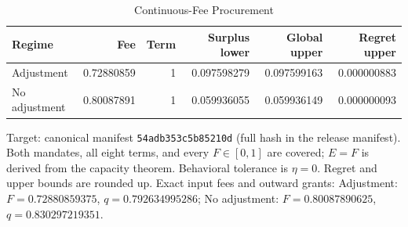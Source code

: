\begin{table}[t]
\caption{Continuous-Fee Procurement}\label{tab:continuous}
\centering
\footnotesize
\begin{tabular}{@{}lrrrrr@{}}
\toprule
Regime & Fee & Term & Surplus lower & Global upper & Regret upper \\
\midrule
Adjustment & 0.72880859 & 1 & 0.097598279 & 0.097599163 & 0.000000883 \\
No adjustment & 0.80087891 & 1 & 0.059936055 & 0.059936149 & 0.000000093 \\
\bottomrule
\end{tabular}
\par\smallskip\begin{minipage}{\linewidth}\footnotesize Target: canonical manifest \texttt{54adb353c5b85210d} (full hash in the release manifest). Both mandates, all eight terms, and every $F\in[0,1]$ are covered; $E=F$ is derived from the capacity theorem. Behavioral tolerance is $\eta=0$. Regret and upper bounds are rounded up. Exact input fees and outward grants: Adjustment: $F=0.72880859375$, $q=0.792634995286$; No adjustment: $F=0.80087890625$, $q=0.830297219351$.\end{minipage}
\end{table}
